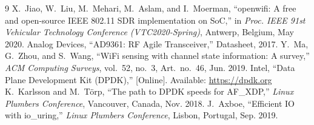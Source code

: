 \documentclass[10pt,a4paper]{article}
\begin{document}
\begin{thebibliography}{9}
 X.~Jiao, W.~Liu, M.~Mehari, M.~Aslam, and I.~Moerman,
``openwifi: A free and open-source IEEE 802.11 SDR implementation on SoC,''
in \emph{Proc. IEEE 91st Vehicular Technology Conference (VTC2020-Spring)},
Antwerp, Belgium, May 2020.
 Analog Devices, ``AD9361: RF Agile Transceiver,'' Datasheet,
2017.
 Y.~Ma, G.~Zhou, and S.~Wang, ``WiFi sensing with channel
state information: A survey,'' \emph{ACM Computing Surveys}, vol.~52, no.~3,
Art.~no.~46, Jun. 2019.
 Intel, ``Data Plane Development Kit (DPDK),'' [Online].
Available: \url{https://dpdk.org}
 K.~Karlsson and M.~T\"orp, ``The path to DPDK speeds for
AF\_XDP,'' \emph{Linux Plumbers Conference}, Vancouver, Canada, Nov. 2018.
 J.~Axboe, ``Efficient IO with io\_uring,'' \emph{Linux
Plumbers Conference}, Lisbon, Portugal, Sep. 2019.
\end{thebibliography}
\end{document}
